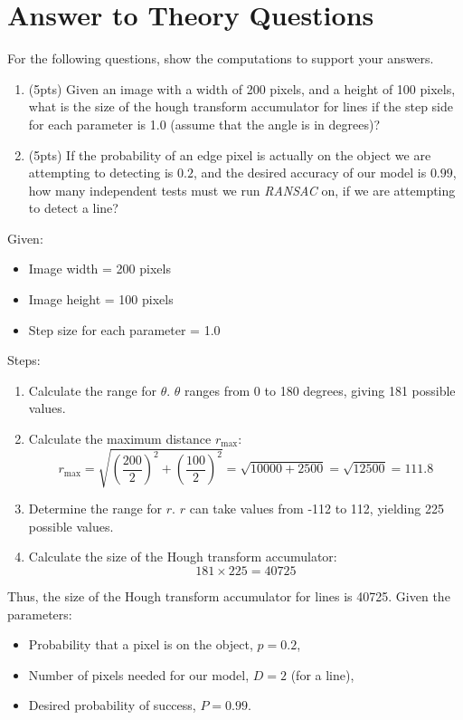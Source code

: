 \documentclass[12pt]{article}
\begin{document}
\part{Answer to Theory Questions}
For the following questions, show the computations to support your answers.
\begin{enumerate}
	\item (5pts) Given an image with a width of 200 pixels, and a height of 100 pixels, what is the size of the hough transform accumulator for lines if the step side for each parameter is 1.0 (assume that the angle is in degrees)?
	\item (5pts) If the probability of an edge pixel is actually on the object we are attempting to detecting is $0.2$, and the desired accuracy of our model is $0.99$, how many independent tests must we run \emph{RANSAC} on, if we are attempting to detect a line?
\end{enumerate}

Given:
\begin{itemize}
	\item Image width = 200 pixels
	\item Image height = 100 pixels
	\item Step size for each parameter = 1.0
\end{itemize}

Steps:

\begin{enumerate}
	\item Calculate the range for \(\theta\). \(\theta\) ranges from 0 to 180 degrees, giving 181 possible values.
	
	\item Calculate the maximum distance \(r_{\text{max}}\):
	\[r_{\text{max}} = \sqrt{\left(\frac{200}{2}\right)^2 + \left(\frac{100}{2}\right)^2} = \sqrt{10000 + 2500} = \sqrt{12500} = 111.8\]
	
	\item Determine the range for \(r\). \(r\) can take values from -112 to 112, yielding 225 possible values.
	
	\item Calculate the size of the Hough transform accumulator:
	\[181 \times 225 = 40725\]
\end{enumerate}

Thus, the size of the Hough transform accumulator for lines is 40725.
Given the parameters:
\begin{itemize}
	\item Probability that a pixel is on the object, \(p = 0.2\),
	\item Number of pixels needed for our model, \(D = 2\) (for a line),
	\item Desired probability of success, \(P = 0.99\).
\end{itemize}
\end{document}
